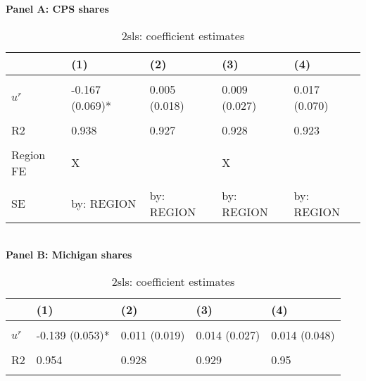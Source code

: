 \begin{table}[!htbp] \centering
\caption{2sls: coefficient estimates}
\label{tab:models}
\textbf{Panel A: CPS shares} \\ 
\begin{tabular}{lllll}
\toprule
 & (1) & (2) & (3) & (4)\\
\midrule
\cellcolor{gray!10}{$p^e$} & \cellcolor{gray!10}{0.560 (0.095)***} & \cellcolor{gray!10}{0.282 (0.039)***} & \cellcolor{gray!10}{0.276 (0.046)***} & \cellcolor{gray!10}{0.670 (0.123)**}\\
$u^r$ & -0.167 (0.069)* & 0.005 (0.018) & 0.009 (0.027) & 0.017 (0.070)\\
\hline
\cellcolor{gray!10}{N} & \cellcolor{gray!10}{1,387} & \cellcolor{gray!10}{1,387} & \cellcolor{gray!10}{1,387} & \cellcolor{gray!10}{1,387}\\
R2 & 0.938 & 0.927 & 0.928 & 0.923\\
\cellcolor{gray!10}{within R2} & \cellcolor{gray!10}{0.401} & \cellcolor{gray!10}{} & \cellcolor{gray!10}{0.927} & \cellcolor{gray!10}{0.3}\\
\addlinespace
Region FE & X &  & X & \\
\cellcolor{gray!10}{Time FE} & \cellcolor{gray!10}{X} & \cellcolor{gray!10}{} & \cellcolor{gray!10}{} & \cellcolor{gray!10}{X}\\
SE & by: REGION & by: REGION & by: REGION & by: REGION\\
\bottomrule
\end{tabular} \vspace{5mm} 
\\ \textbf{Panel B: Michigan shares} \\ 
\begin{threeparttable}
\begin{tabular}{lllll}
\toprule
 & (1) & (2) & (3) & (4)\\
\midrule
\cellcolor{gray!10}{$p^e$} & \cellcolor{gray!10}{0.339 (0.049)***} & \cellcolor{gray!10}{0.246 (0.036)***} & \cellcolor{gray!10}{0.250 (0.035)***} & \cellcolor{gray!10}{0.371 (0.067)**}\\
$u^r$ & -0.139 (0.053)* & 0.011 (0.019) & 0.014 (0.027) & 0.014 (0.048)\\
\hline
\cellcolor{gray!10}{N} & \cellcolor{gray!10}{1,387} & \cellcolor{gray!10}{1,387} & \cellcolor{gray!10}{1,387} & \cellcolor{gray!10}{1,387}\\
R2 & 0.954 & 0.928 & 0.929 & 0.95\\
\cellcolor{gray!10}{within R2} & \cellcolor{gray!10}{0.551} & \cellcolor{gray!10}{} & \cellcolor{gray!10}{0.928} & \cellcolor{gray!10}{0.539}\\

\end{tabular}
\end{threeparttable}
\end{table}
